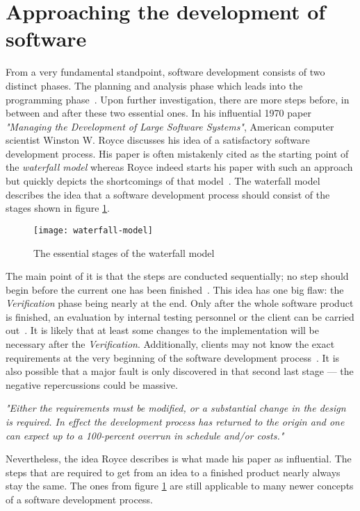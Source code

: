\documentclass[12pt,a4paper]{report}
\begin{document}
\section{Approaching the development of software} \label{sect:software-development-process}

From a very fundamental standpoint, software development consists of two distinct phases.
The planning and analysis phase which leads into the programming phase~\cite{royce-large-systems}.
Upon further investigation, there are more steps before, in between and after these two essential ones.
In his influential 1970 paper \textit{"Managing the Development of Large Software Systems"},
American computer scientist Winston W. Royce discusses his idea of a satisfactory
software development process. His paper is often mistakenly cited as the starting point
of the \textit{waterfall model} whereas Royce indeed starts his paper with such an approach but quickly
depicts the shortcomings of that model~\cite{royce-large-systems, larman-iid-history}.
The waterfall model describes the idea that a software development process should consist of
the stages shown in figure \ref{fig:waterfall-model}.
\begin{figure}[htb]
\centering
\texttt{[image: waterfall-model]}
\caption{The essential stages of the waterfall model}
\label{fig:waterfall-model}
\end{figure}
The main point of it is that the steps are conducted sequentially;
no step should begin before the current one has been finished~\cite{boehm-spiral}.
This idea has one big flaw: the \textit{Verification} phase being nearly at the end.
Only after the whole software product is finished, an evaluation by internal testing personnel or
the client can be carried out~\cite{royce-large-systems}.
It is likely that at least some changes to the implementation will be necessary after the \textit{Verification}.
Additionally, clients may not know the exact requirements at the very beginning
of the software development process~\cite{parnas-rational-design-process}.
It is also possible that a major fault is only discovered in that second last stage ---
the negative repercussions could be massive.
\begin{displayquote}
\emph{"Either the requirements must be modified, or a substantial change
in the design is required. In effect the development process has returned to
the origin and one can expect up to a 100-percent overrun
in schedule and/or costs."}~\cite{royce-large-systems}
\end{displayquote}
Nevertheless, the idea Royce describes is what made his paper as influential.
The steps that are required to get from an idea to a finished product nearly always
stay the same. The ones from figure \ref{fig:waterfall-model} are still applicable to
many newer concepts of a software development process.
\end{document}
